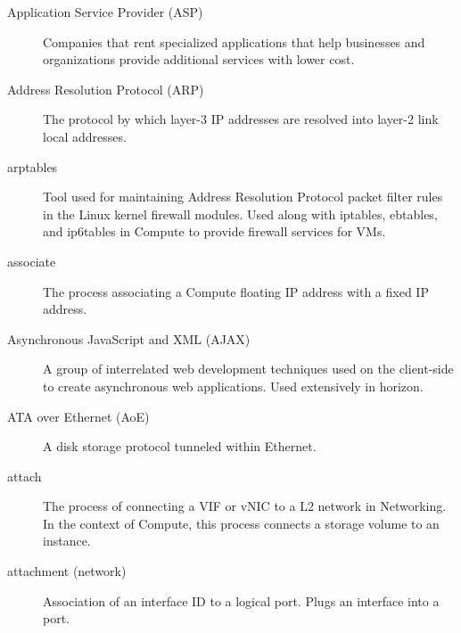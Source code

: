\documentclass[letterpaper,10pt,english]{sphinxmanual}
\begin{document}
\begin{description}
\item[{Application Service Provider (ASP)}] \leavevmode{}\label{_source/glossary:term-application-service-provider-asp}
Companies that rent specialized applications that help
businesses and organizations provide additional services
with lower cost.

\item[{Address Resolution Protocol (ARP)}] \leavevmode{}\label{_source/glossary:term-address-resolution-protocol-arp}
The protocol by which layer-3 IP addresses are resolved into
layer-2 link local addresses.

\item[{arptables}] \leavevmode{}\label{_source/glossary:term-arptables}
Tool used for maintaining Address Resolution Protocol packet
filter rules in the Linux kernel firewall modules. Used along with
iptables, ebtables, and ip6tables in Compute to provide firewall
services for VMs.

\item[{associate}] \leavevmode{}\label{_source/glossary:term-associate}
The process associating a Compute floating IP address with a
fixed IP address.

\item[{Asynchronous JavaScript and XML (AJAX)}] \leavevmode{}\label{_source/glossary:term-asynchronous-javascript-and-xml-ajax}
A group of interrelated web development techniques used on the
client-side to create asynchronous web applications. Used extensively
in horizon.

\item[{ATA over Ethernet (AoE)}] \leavevmode{}\label{_source/glossary:term-ata-over-ethernet-aoe}
A disk storage protocol tunneled within Ethernet.

\item[{attach}] \leavevmode{}\label{_source/glossary:term-attach}
The process of connecting a VIF or vNIC to a L2 network in
Networking. In the context of Compute, this process connects a storage
volume to an instance.

\item[{attachment (network)}] \leavevmode{}\label{_source/glossary:term-attachment-network}
Association of an interface ID to a logical port. Plugs an
interface into a port.


\end{description}
\end{document}
